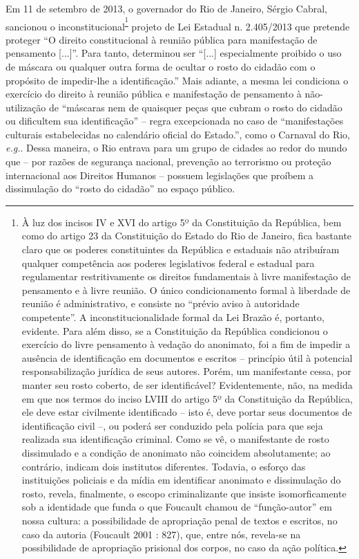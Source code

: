 Em 11 de setembro de 2013, o governador do Rio de Janeiro, Sérgio
Cabral, sancionou o inconstitucional\textsuperscript{\footnote{À luz dos
  incisos IV e XVI do artigo 5º da Constituição da República, bem como
  do artigo 23 da Constituição do Estado do Rio de Janeiro, fica
  bastante claro que os poderes constituintes da República e estaduais
  não atribuíram qualquer competência aos poderes legislativos federal e
  estadual para regulamentar restritivamente os direitos fundamentais à
  livre manifestação de pensamento e à livre reunião. O único
  condicionamento formal à liberdade de reunião é administrativo, e
  consiste no ``prévio aviso à autoridade competente''. A
  inconstitucionalidade formal da Lei Brazão é, portanto, evidente. Para
  além disso, se a Constituição da República condicionou o exercício do
  livre pensamento à vedação do anonimato, foi a fim de impedir a
  ausência de identificação em documentos e escritos -- princípio útil à
  potencial responsabilização jurídica de seus autores. Porém, um
  manifestante cessa, por manter seu rosto coberto, de ser
  identificável? Evidentemente, não, na medida em que nos termos do
  inciso LVIII do artigo 5º da Constituição da República, ele deve estar
  civilmente identificado -- isto é, deve portar seus documentos de
  identificação civil --, ou poderá ser conduzido pela polícia para que
  seja realizada sua identificação criminal. Como se vê, o manifestante
  de rosto dissimulado e a condição de anonimato não coincidem
  absolutamente; ao contrário, indicam dois institutos diferentes.
  Todavia, o esforço das instituições policiais e da mídia em
  identificar anonimato e dissimulação do rosto, revela, finalmente, o
  escopo criminalizante que insiste isomorficamente sob a identidade que
  funda o que Foucault chamou de ``função-autor'' em nossa cultura: a
  possibilidade de apropriação penal de textos e escritos, no caso da
  autoria (Foucault 2001 : 827), que, entre nós, revela-se na
  possibilidade de apropriação prisional dos corpos, no caso da ação
  política.}} projeto de Lei Estadual n. 2.405/2013 que pretende
proteger ``O direito constitucional à reunião pública para manifestação
de pensamento {[}...{]}''. Para tanto, determinou ser ``{[}...{]}
especialmente proibido o uso de máscara ou qualquer outra forma de
ocultar o rosto do cidadão com o propósito de impedir-lhe a
identificação.'' Mais adiante, a mesma lei condiciona o exercício do
direito à reunião pública e manifestação de pensamento à não-utilização
de ``máscaras nem de quaisquer peças que cubram o rosto do cidadão ou
dificultem sua identificação'' -- regra excepcionada no caso de
``manifestações culturais estabelecidas no calendário oficial do
Estado.'', como o Carnaval do Rio, \emph{e.g.}. Dessa maneira, o Rio
entrava para um grupo de cidades ao redor do mundo que -- por razões de
segurança nacional, prevenção ao terrorismo ou proteção internacional
aos Direitos Humanos -- possuem legislações que proíbem a dissimulação
do ``rosto do cidadão'' no espaço público.

